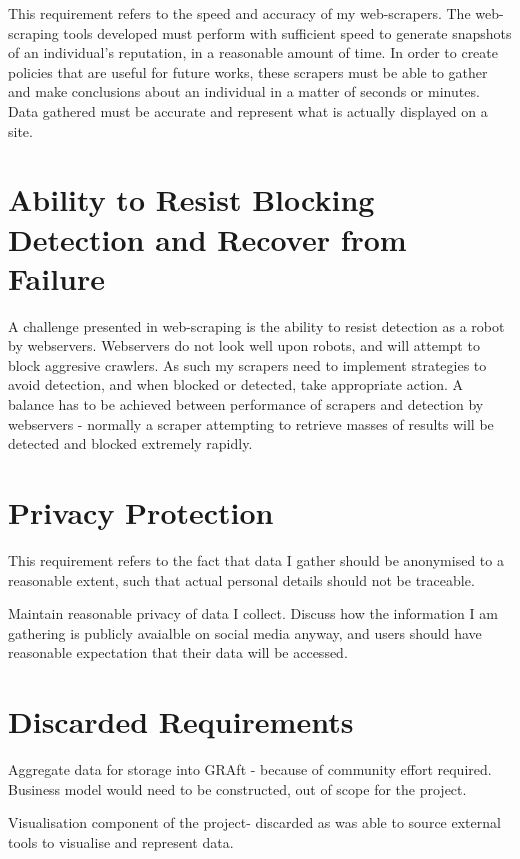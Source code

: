 This requirement refers to the speed and accuracy of my web-scrapers. The web-scraping tools developed must perform with sufficient speed to generate snapshots of an individual's reputation, in a reasonable amount of time. In order to create policies that are useful for future works, these scrapers must be able to gather and make conclusions about an individual in a matter of seconds or minutes. Data gathered must be accurate and represent what is actually displayed on a site. 

\section{Ability to Resist Blocking Detection and Recover from Failure}

A challenge presented in web-scraping is the ability to resist detection as a robot by webservers. Webservers do not look well upon robots, and will attempt to block aggresive crawlers. As such my scrapers need to implement strategies to avoid detection, and when blocked or detected, take appropriate action. A balance has to be achieved between performance of scrapers and detection by webservers - normally a scraper attempting to retrieve masses of results will be detected and blocked extremely rapidly. 

\section{Privacy Protection}

This requirement refers to the fact that data I gather should be anonymised to a reasonable extent, such that actual personal details should not be traceable. 

Maintain reasonable privacy of data I collect. Discuss how the information I am gathering is publicly avaialble on social media anyway, and users should have reasonable expectation that their data will be accessed. 

\section{Discarded Requirements}

Aggregate data for storage into GRAft - because of community effort required. Business model would need to be constructed, out of scope for the project.

Visualisation component of the project-  discarded as was able to source external tools to visualise and represent data. 



